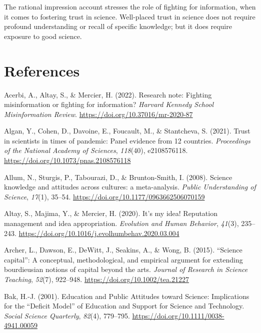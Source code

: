 \documentclass[
  jou,
  floatsintext,
  longtable,
  nolmodern,
  notxfonts,
  notimes,
  colorlinks=true,linkcolor=blue,citecolor=blue,urlcolor=blue]{apa7}
\newlength{\cslhangindent}
\newenvironment{CSLReferences}[2] %
 {\begin{list}{}{%
  \setlength{\itemindent}{0pt}
  \setlength{\leftmargin}{0pt}
  \setlength{\parsep}{0pt}
  \ifodd #1
   \setlength{\leftmargin}{\cslhangindent}
   \setlength{\itemindent}{-1\cslhangindent}
  \fi
  \setlength{\itemsep}{#2\baselineskip}}}
 {\end{list}}
\begin{document}
The rational impression account stresses the role of fighting for
information, when it comes to fostering trust in science. Well-placed
trust in science does not require profound understanding or recall of
specific knowledge; but it does require exposure to good science.

\section{References}\label{references}

\label{refs}
\begin{CSLReferences}{1}{0}
Acerbi, A., Altay, S., \& Mercier, H. (2022). Research note: Fighting
misinformation or fighting for information? \emph{Harvard Kennedy School
Misinformation Review}. \url{https://doi.org/10.37016/mr-2020-87}

Algan, Y., Cohen, D., Davoine, E., Foucault, M., \& Stantcheva, S.
(2021). Trust in scientists in times of pandemic: Panel evidence from 12
countries. \emph{Proceedings of the National Academy of Sciences},
\emph{118}(40), e2108576118.
\url{https://doi.org/10.1073/pnas.2108576118}

Allum, N., Sturgis, P., Tabourazi, D., \& Brunton-Smith, I. (2008).
Science knowledge and attitudes across cultures: a meta-analysis.
\emph{Public Understanding of Science}, \emph{17}(1), 35--54.
\url{https://doi.org/10.1177/0963662506070159}

Altay, S., Majima, Y., \& Mercier, H. (2020). It's my idea! Reputation
management and idea appropriation. \emph{Evolution and Human Behavior},
\emph{41}(3), 235--243.
\url{https://doi.org/10.1016/j.evolhumbehav.2020.03.004}

Archer, L., Dawson, E., DeWitt, J., Seakins, A., \& Wong, B. (2015).
{``}Science capital{''}: A conceptual, methodological, and empirical
argument for extending bourdieusian notions of capital beyond the arts.
\emph{Journal of Research in Science Teaching}, \emph{52}(7), 922--948.
\url{https://doi.org/10.1002/tea.21227}

Bak, H.-J. (2001). Education and Public Attitudes toward Science:
Implications for the {``}Deficit Model{''} of Education and Support for
Science and Technology. \emph{Social Science Quarterly}, \emph{82}(4),
779--795. \url{https://doi.org/10.1111/0038-4941.00059}


\end{CSLReferences}
\end{document}

